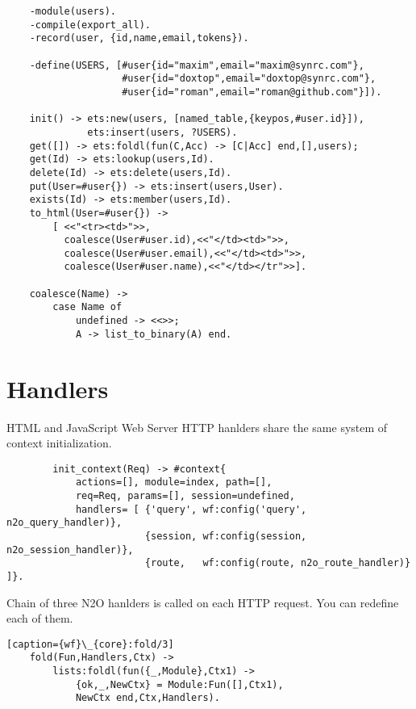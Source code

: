 \vspace{1\baselineskip}
\begin{lstlisting}
    -module(users).
    -compile(export_all).
    -record(user, {id,name,email,tokens}).

    -define(USERS, [#user{id="maxim",email="maxim@synrc.com"},
                    #user{id="doxtop",email="doxtop@synrc.com"},
                    #user{id="roman",email="roman@github.com"}]).

    init() -> ets:new(users, [named_table,{keypos,#user.id}]),
              ets:insert(users, ?USERS).
    get([]) -> ets:foldl(fun(C,Acc) -> [C|Acc] end,[],users);
    get(Id) -> ets:lookup(users,Id).
    delete(Id) -> ets:delete(users,Id).
    put(User=#user{}) -> ets:insert(users,User).
    exists(Id) -> ets:member(users,Id).
    to_html(User=#user{}) ->
        [ <<"<tr><td>">>,
          coalesce(User#user.id),<<"</td><td>">>,
          coalesce(User#user.email),<<"</td><td>">>,
          coalesce(User#user.name),<<"</td></tr">>].

    coalesce(Name) -> 
        case Name of 
            undefined -> <<>>;
            A -> list_to_binary(A) end.
\end{lstlisting}
\vspace{1\baselineskip}

\section{Handlers}
HTML and JavaScript Web Server HTTP hanlders share the same system
of context initialization. 

\vspace{1\baselineskip}
\begin{lstlisting}
        init_context(Req) -> #context{
            actions=[], module=index, path=[],
            req=Req, params=[], session=undefined,
            handlers= [ {'query', wf:config('query', n2o_query_handler)},
                        {session, wf:config(session, n2o_session_handler)},
                        {route,   wf:config(route, n2o_route_handler)} ]}.
\end{lstlisting}
\vspace{1\baselineskip}

Chain of three N2O hanlders is called
on each HTTP request. You can redefine each of them.

\vspace{1\baselineskip}
\begin{lstlisting}[caption={wf}\_{core}:fold/3]
    fold(Fun,Handlers,Ctx) ->
        lists:foldl(fun({_,Module},Ctx1) ->
            {ok,_,NewCtx} = Module:Fun([],Ctx1),
            NewCtx end,Ctx,Handlers).
\end{lstlisting}
\vspace{1\baselineskip}

